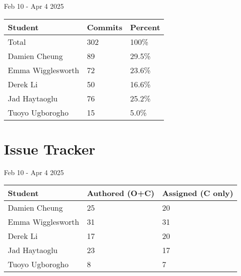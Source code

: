 \documentclass{article}
\begin{document}
Feb 10 - Apr 4 2025

\begin{table}[H]
\centering
\begin{tabular}{lll}
\toprule
\textbf{Student} & \textbf{Commits} & \textbf{Percent}\\
\midrule
Total & 302 & 100\% \\
Damien Cheung & 89 & 29.5\% \\
Emma Wigglesworth & 72 & 23.6\% \\
Derek Li & 50 & 16.6\% \\
Jad Haytaoglu & 76 & 25.2\% \\
Tuoyo Ugborogho & 15 & 5.0\% \\
\bottomrule
\end{tabular}
\end{table}

\section{Issue Tracker}

Feb 10 - Apr 4 2025

\begin{table}[H]
\centering
\begin{tabular}{lll}
\toprule
\textbf{Student} & \textbf{Authored (O+C)} & \textbf{Assigned (C only)}\\
\midrule
Damien Cheung & 25 & 20 \\
Emma Wigglesworth & 31 & 31 \\
Derek Li & 17 & 20 \\
Jad Haytaoglu & 23 & 17 \\
Tuoyo Ugborogho & 8 & 7 \\
\bottomrule
\end{tabular}
\end{table}
\end{document}

